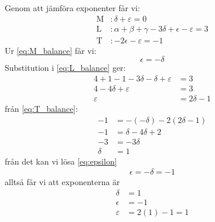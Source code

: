 \documentclass[a4paper,12pt]{article}
\begin{document}
%
Genom att jämföra exponenter får vi:
\begin{align}
    \mathrm{M}&: \delta + \varepsilon = 0 \label{eq:M_balance} \\
    \mathrm{L}&: \alpha + \beta + \gamma - 3\delta + \epsilon - \varepsilon = 3 \label{eq:L_balance} \\
    \mathrm{T}&: -2\epsilon - \varepsilon = -1 \label{eq:T_balance}
\end{align}
%
Ur \cref{eq:M_balance} får vi:
\begin{equation}
    \epsilon = -\delta \label{eq:epsilon}
\end{equation}
%
Substitution i \cref{eq:L_balance} ger:
\begin{align}
    4 + 1 - 1 - 3\delta - \delta + \varepsilon &= 3 \\
    4 - 4\delta + \varepsilon &= 3 \\
    \varepsilon &= 2\delta - 1
\end{align}
%
från \cref{eq:T_balance}:
\begin{align}
    -1 &= -(-\delta) - 2(2\delta - 1) \\
    -1 &= \delta - 4\delta + 2 \\
    -3 &= -3\delta \\
    \delta &= 1
\end{align}
%
från det kan vi lösa \cref{eq:epsilon}
\begin{align}
    \epsilon = -\delta = -1
\end{align}
alltså får vi att exponenterna är
\begin{align}
    \delta &= 1 \\
    \epsilon &= -1 \\
    \varepsilon &= 2(1) - 1 = 1
\end{align}
%
\newpage
\end{document}
